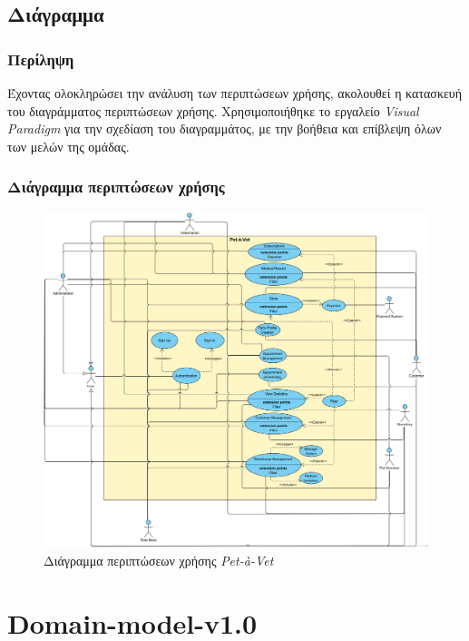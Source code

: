 \documentclass[12pt,a4paper,twoside]{book}
\begin{document}
\section{Διάγραμμα} %

\subsection{Περίληψη}

Έχοντας ολοκληρώσει την ανάλυση των περιπτώσεων χρήσης, ακολουθεί η κατασκευή του διαγράμματος περιπτώσεων χρήσης. Χρησιμοποιήθηκε το εργαλείο \textit{Visual Paradigm} για την σχεδίαση του διαγραμμάτος, με την βοήθεια και επίβλεψη όλων των μελών της ομάδας. %

\subsection{Διάγραμμα περιπτώσεων χρήσης}

\begin{figure}[H]
  \centering
  \includegraphics[width=1\textwidth]{Resources/Use-casel-v0.2.png}
  \caption{Διάγραμμα περιπτώσεων χρήσης \textit{Pet-à-Vet}}\label{fig:use-case-diagram}
\end{figure}

\chapter{Domain-model-v1.0}
\end{document}
